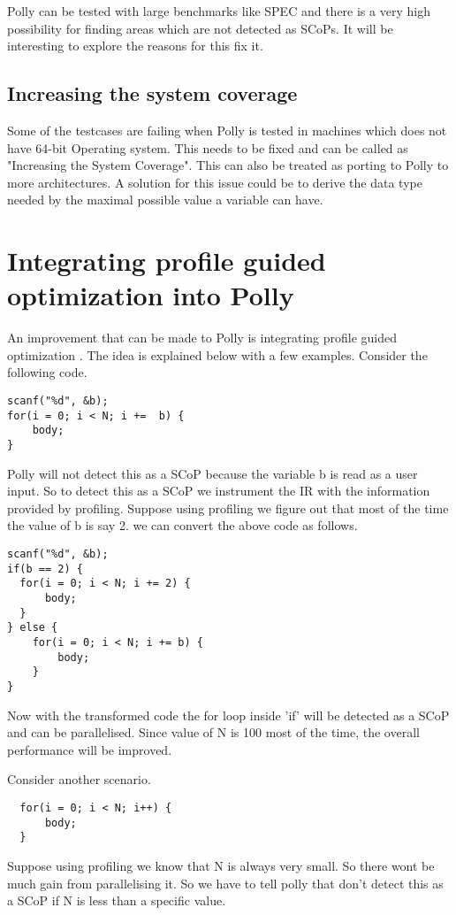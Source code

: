 Polly can be tested with large benchmarks like SPEC and there is a very high possibility
for finding areas which are not detected as SCoPs. It will be interesting to
explore the reasons for this fix it.
\subsection{Increasing the system coverage}

Some of the testcases are failing when Polly is tested in machines which does not
have 64-bit Operating system. This needs to be fixed and can be called as "Increasing the System Coverage".
This can also be treated as porting to Polly to more architectures.
A solution for this issue could be to derive the data type needed by the maximal possible value a variable can have.

\section{Integrating profile guided optimization into Polly}
An improvement that can be made to Polly is integrating profile guided optimization
\cite{pgo}. The idea is explained below with a few examples. Consider the following code.
{\footnotesize
\begin{lstlisting}
scanf("%d", &b);
for(i = 0; i < N; i +=  b) {
    body;
}
\end{lstlisting}
}
Polly will not detect this as a SCoP because the variable b is read as a user
input. So to detect this as a SCoP we instrument the IR with the information
provided by profiling. Suppose using profiling we figure out that most of the 
time the value of b is say 2. we can convert the above code as follows.
{\footnotesize
\begin{lstlisting}
scanf("%d", &b);
if(b == 2) {
  for(i = 0; i < N; i += 2) {
      body;
  }
} else {
    for(i = 0; i < N; i += b) {
        body;
    }
}
\end{lstlisting}
}
Now with the transformed code the for loop inside 'if' will be detected as a 
SCoP and can be parallelised. Since value of N is 100 most of the time, the 
overall performance will be improved.

\noindent
Consider another scenario.
{\footnotesize
\begin{lstlisting}
  for(i = 0; i < N; i++) {
      body;
  }
\end{lstlisting}
}
Suppose using profiling we know that N is always very small. So there wont be
much gain from parallelising it. So we have to tell polly that don't detect
this as a SCoP if N is less than a specific value.

